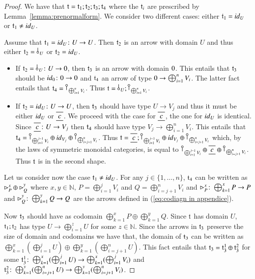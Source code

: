 \begin{proof}
We have that $\mathfrak{t}= \mathfrak{t}_1;\mathfrak{t}_2;\mathfrak{t}_3;\mathfrak{t}_4$ where the $\mathfrak{t}_i$ are prescribed by Lemma~\ref{lemma:prenormalform}.
We consider two different cases: either $\mathfrak{t}_1={id}_{U}$ or $\mathfrak{t}_1 \neq {id}_{U}$.

Assume that $\mathfrak{t}_1={id}_{U}\colon U \to U$. Then $\mathfrak{t}_2$ is an arrow with domain $U$ and thus either $\t_2 = \bang{U}$ or $\mathfrak{t}_2= {id}_{U}$. 

\begin{itemize}
\item If $\t_2 = \bang{U} \colon U \to \zero$, then $\mathfrak{t}_3$ is an arrow with domain $0$. This entails that $\mathfrak{t}_3$ should be ${id}_{0}\colon 0 \to 0$ and $\mathfrak{t}_4$ an arrow of type $0 \to \bigoplus_{i=1}^n V_i$. The latter fact entails that $\t_4 = \cobang{\bigoplus_{i=1}^n V_i}$. Thus $\t= \bang{U}; \cobang{\bigoplus_{i=1}^n V_i}$.
\item If $\mathfrak{t}_2 = {id}_{U} \colon U \to U$, then $\mathfrak{t}_3$ should have type $U\to V_j$ and thus it must be either ${id}_{U}$ or $\tape{c}$. We proceed with the case for $\tape{c}$, the one for ${id}_{U}$ is identical. Since $\tape{c}\colon U\to V_j$ then $\mathfrak{t}_4$ should have type $V_j \to \bigoplus_{i=1}^n V_i$. This entails that $\t_4= \cobang{\bigoplus_{i=1}^{j-1} V_i} \oplus \id{V_j} \oplus \cobang{\bigoplus_{i=j+1}^{n} V_i}$. Thus $\t= \tape{c};\cobang{\bigoplus_{i=1}^{j-1} V_i} \oplus \id{V_j} \oplus \cobang{\bigoplus_{i=j+1}^{n} V_i}$ which, by the laws of symmetric monoidal categories, is equal to $\cobang{\bigoplus_{i=1}^{j-1} V_i} \oplus \tape{c} \oplus \cobang{\bigoplus_{i=j+1}^{n} V_i}$. Thus $\mathfrak{t}$ is in the second shape.
\end{itemize}

Let us consider now the case $\mathfrak{t}_1 \neq {id}_{U}$. For any $j\in \{1,\dots, n\}$, $\mathfrak{t}_4$ can be written as $\rhd_{P}^x \oplus \rhd_{Q}^{y}$ where 
$x,y\in \mathbb{N}$, $P=\bigoplus_{i=1}^{j} V_i$ and $Q=\bigoplus_{i=j+1}^{n} V_i$
and  $\rhd_{P}^x\colon \bigoplus_{k=1}^x P \to P$ and $\rhd_{Q}^y \colon  \bigoplus_{k=1}^yQ\to Q$ are the arrows defined in (\ref{eq:codiagn in appendice}).

Now $\mathfrak{t}_3$ should have as codomain $ \bigoplus_{k=1}^x P \oplus \bigoplus_{k=1}^yQ$. Since $\mathfrak{t}$ has domain $U$, $\mathfrak{t}_1; \mathfrak{t}_2$ has type $U \to \bigoplus_{i=1}^z U$ for some $z\in \mathbb{N}$. Since the arrows in $\mathfrak{t}_3$ preserve the size of domain and codomains we have that, the domain of $\mathfrak{t}_3$ can be written as $ \bigoplus_{k=1}^x(\bigoplus_{i=1}^{j} U) \oplus \bigoplus_{k=1}^y(\bigoplus_{i=j+1}^{n} U)$. This fact entails that $\mathfrak{t}_3= \mathfrak{t}_3^1 \oplus \mathfrak{t}_3^2$ for some $\mathfrak{t}_3^1 \colon  \bigoplus_{k=1}^x(\bigoplus_{i=1}^{j} U) \to  \bigoplus_{k=1}^x(\bigoplus_{i=1}^{j} V_i)$ and  $\mathfrak{t}_3^2 \colon  \bigoplus_{k=1}^y(\bigoplus_{i=j+1}^{n} U) \to  \bigoplus_{k=1}^y(\bigoplus_{i=j+1}^{n} V_i)$. 


\end{proof}
